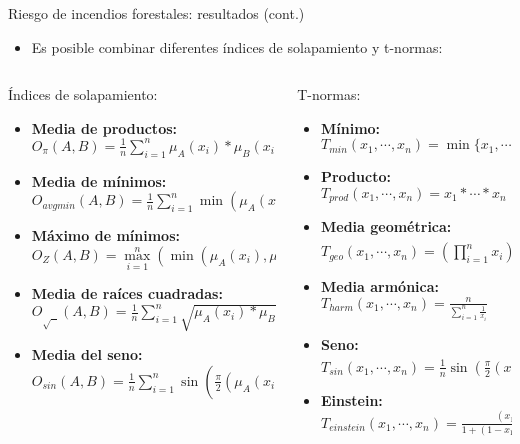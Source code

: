 \documentclass{beamer}
\begin{document}
\begin{frame}{Riesgo de incendios forestales: resultados (cont.)}
\begin{itemize}
\item Es posible combinar diferentes índices de solapamiento y t-normas:
\end{itemize}
\begin{columns}[T] %
\begin{column}{.48\textwidth}
Índices de solapamiento:
\footnotesize
\begin{itemize}
	\item \bfseries Media de productos: \\ $O_{\pi}(A,B) = \frac{1}{n}\sum_{i=1}^{n}\mu_A(x_i)*\mu_B(x_i)$
	\item \bfseries Media de mínimos: \\ $O_{avgmin}(A,B) = \frac{1}{n}\sum_{i=1}^{n}\min(\mu_A(x_i),\mu_B(x_i))$
	\item \bfseries Máximo de mínimos: \\ $O_{Z}(A,B) = \max\limits_{i=1}^{n}(\min(\mu_A(x_i),\mu_B(x_i)))$
	\item \bfseries Media de raíces cuadradas: \\ $O_{\sqrt{\text{ }}}(A,B) =  \frac{1}{n}\sum_{i=1}^{n}\sqrt{\mu_A(x_i)*\mu_B(x_i)}$
	\item \bfseries Media del seno:  \\ $O_{sin}(A, B) = \frac{1}{n}\sum_{i=1}^{n}\sin(\frac{\pi}{2}(\mu_A(x_i)*\mu_B(x_i))^{\frac{1}{4}})$
\end{itemize}
\end{column}%
\hfill%
\begin{column}{.48\textwidth}
T-normas:
\footnotesize
\begin{itemize}
	\item \bfseries Mínimo: \\ $T_{min}(x_{1},\cdots,x_{n}) = \min\{x_{1},\cdots,x_{n}\}$
	\item \bfseries Producto:\\ $T_{prod}(x_{1},\cdots,x_{n}) = x_{1} * \cdots * x_{n}$
	\item \bfseries Media geométrica:\\ $T_{geo}(x_{1},\cdots,x_{n}) = (\prod\limits_{i=1}^{n}x_{i})^{\frac{1}{n}}$
	\item \bfseries Media armónica:\\ $T_{harm}(x_{1},\cdots,x_{n}) = \frac{n}{\sum_{i=1}^{n}\frac{1}{x_i}}$
	\item \bfseries Seno:\\ $T_{sin}(x_{1},\cdots,x_{n}) = \frac{1}{n}\sin(\frac{\pi}{2}(x_1 * \ldots * x_n))^{\frac{1}{4}}$
	\item \bfseries Einstein:\\ $T_{einstein}(x_{1},\cdots,x_{n}) = \frac{(x_{1} * \cdots * x_{n})}{1 + (1 - x_{1} )* \ldots * (1 - x_{n} )}$
\end{itemize}
\end{column}%
\end{columns}
\end{frame}
\end{document}

